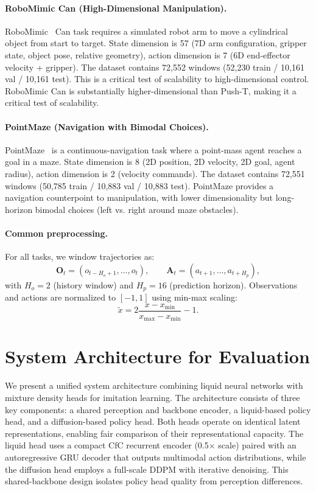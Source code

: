 \documentclass{article}
\begin{document}
\paragraph{RoboMimic Can (High-Dimensional Manipulation).}
RoboMimic~\cite{mandlekar2021robomimic} Can task requires a simulated robot arm to move a cylindrical object from start to target. State dimension is 57 (7D arm configuration, gripper state, object pose, relative geometry), action dimension is 7 (6D end-effector velocity + gripper). The dataset contains 72,552 windows (52,230 train / 10,161 val / 10,161 test). This is a critical test of scalability to high-dimensional control. RoboMimic Can is substantially higher-dimensional than Push-T, making it a critical test of scalability.

\paragraph{PointMaze (Navigation with Bimodal Choices).}
PointMaze~\cite{fu2021d4rl} is a continuous-navigation task where a point-mass agent reaches a goal in a maze. State dimension is 8 (2D position, 2D velocity, 2D goal, agent radius), action dimension is 2 (velocity commands). The dataset contains 72,551 windows (50,785 train / 10,883 val / 10,883 test). PointMaze provides a navigation counterpoint to manipulation, with lower dimensionality but long-horizon bimodal choices (left vs. right around maze obstacles).

\paragraph{Common preprocessing.}
For all tasks, we window trajectories as:
\begin{equation}
\mathbf{O}_{t}=(o_{t-H_o+1},\dots,o_t),\qquad
\mathbf{A}_{t}=(a_{t+1},\dots,a_{t+H_p}),
\end{equation}
with $H_o=2$ (history window) and $H_p=16$ (prediction horizon). Observations and actions are normalized to $[-1,1]$ using min-max scaling:
\begin{equation}
    \widetilde{x}=2\frac{x-x_{\min}}{x_{\max}-x_{\min}}-1.
\end{equation}

\section{System Architecture for Evaluation}

We present a unified system architecture combining liquid neural networks with mixture density heads for imitation learning. The architecture consists of three key components: a shared perception and backbone encoder, a liquid-based policy head, and a diffusion-based policy head. Both heads operate on identical latent representations, enabling fair comparison of their representational capacity. The liquid head uses a compact CfC recurrent encoder (0.5$\times$ scale) paired with an autoregressive GRU decoder that outputs multimodal action distributions, while the diffusion head employs a full-scale DDPM with iterative denoising. This shared-backbone design isolates policy head quality from perception differences.
\end{document}
